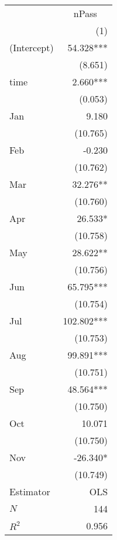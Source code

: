 \begin{tabular}{lr}
\toprule
            & \multicolumn{1}{c}{nPass} \\ 
\cmidrule(lr){2-2} 
            &                       (1) \\ 
\midrule
(Intercept) &                 54.328*** \\ 
            &                   (8.651) \\ 
time        &                  2.660*** \\ 
            &                   (0.053) \\ 
Jan         &                     9.180 \\ 
            &                  (10.765) \\ 
Feb         &                    -0.230 \\ 
            &                  (10.762) \\ 
Mar         &                  32.276** \\ 
            &                  (10.760) \\ 
Apr         &                   26.533* \\ 
            &                  (10.758) \\ 
May         &                  28.622** \\ 
            &                  (10.756) \\ 
Jun         &                 65.795*** \\ 
            &                  (10.754) \\ 
Jul         &                102.802*** \\ 
            &                  (10.753) \\ 
Aug         &                 99.891*** \\ 
            &                  (10.751) \\ 
Sep         &                 48.564*** \\ 
            &                  (10.750) \\ 
Oct         &                    10.071 \\ 
            &                  (10.750) \\ 
Nov         &                  -26.340* \\ 
            &                  (10.749) \\ 
\midrule
Estimator   &                       OLS \\ 
\midrule
$N$         &                       144 \\ 
$R^2$       &                     0.956 \\ 
\bottomrule
\end{tabular}
